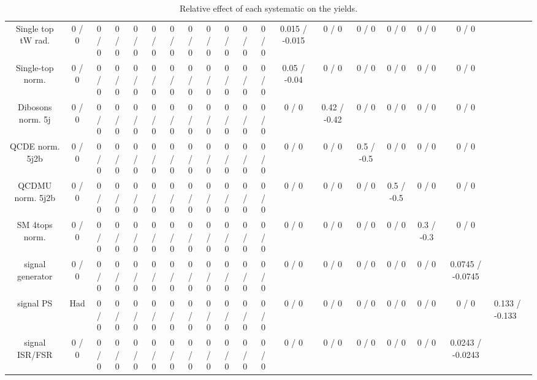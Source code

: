 \documentclass[10pt]{article}
\begin{document}
\begin{table}[htbp]
\begin{center}
\begin{tabular}{|c|c|c|c|c|c|c|c|c|c|c|c|c|c|c|c|c|c|}
  Single top tW rad. & 0 / 0 & 0 / 0 & 0 / 0 & 0 / 0 & 0 / 0 & 0 / 0 & 0 / 0 & 0 / 0 & 0 / 0 & 0 / 0 & 0 / 0 & 0.015 / -0.015 & 0 / 0 & 0 / 0 & 0 / 0 & 0 / 0 & 0 / 0 \\ 
  Single-top norm. & 0 / 0 & 0 / 0 & 0 / 0 & 0 / 0 & 0 / 0 & 0 / 0 & 0 / 0 & 0 / 0 & 0 / 0 & 0 / 0 & 0 / 0 & 0.05 / -0.04 & 0 / 0 & 0 / 0 & 0 / 0 & 0 / 0 & 0 / 0 \\ 
  Dibosons norm. 5j & 0 / 0 & 0 / 0 & 0 / 0 & 0 / 0 & 0 / 0 & 0 / 0 & 0 / 0 & 0 / 0 & 0 / 0 & 0 / 0 & 0 / 0 & 0 / 0 & 0.42 / -0.42 & 0 / 0 & 0 / 0 & 0 / 0 & 0 / 0 \\ 
  QCDE norm. 5j2b & 0 / 0 & 0 / 0 & 0 / 0 & 0 / 0 & 0 / 0 & 0 / 0 & 0 / 0 & 0 / 0 & 0 / 0 & 0 / 0 & 0 / 0 & 0 / 0 & 0 / 0 & 0.5 / -0.5 & 0 / 0 & 0 / 0 & 0 / 0 \\ 
  QCDMU norm. 5j2b & 0 / 0 & 0 / 0 & 0 / 0 & 0 / 0 & 0 / 0 & 0 / 0 & 0 / 0 & 0 / 0 & 0 / 0 & 0 / 0 & 0 / 0 & 0 / 0 & 0 / 0 & 0 / 0 & 0.5 / -0.5 & 0 / 0 & 0 / 0 \\ 
  SM 4tops norm. & 0 / 0 & 0 / 0 & 0 / 0 & 0 / 0 & 0 / 0 & 0 / 0 & 0 / 0 & 0 / 0 & 0 / 0 & 0 / 0 & 0 / 0 & 0 / 0 & 0 / 0 & 0 / 0 & 0 / 0 & 0.3 / -0.3 & 0 / 0 \\ 
  signal generator & 0 / 0 & 0 / 0 & 0 / 0 & 0 / 0 & 0 / 0 & 0 / 0 & 0 / 0 & 0 / 0 & 0 / 0 & 0 / 0 & 0 / 0 & 0 / 0 & 0 / 0 & 0 / 0 & 0 / 0 & 0 / 0 & 0.0745 / -0.0745 \\ 
  signal PS & Had & 0 / 0 & 0 / 0 & 0 / 0 & 0 / 0 & 0 / 0 & 0 / 0 & 0 / 0 & 0 / 0 & 0 / 0 & 0 / 0 & 0 / 0 & 0 / 0 & 0 / 0 & 0 / 0 & 0 / 0 & 0 / 0 & 0.133 / -0.133 \\ 
  signal ISR/FSR & 0 / 0 & 0 / 0 & 0 / 0 & 0 / 0 & 0 / 0 & 0 / 0 & 0 / 0 & 0 / 0 & 0 / 0 & 0 / 0 & 0 / 0 & 0 / 0 & 0 / 0 & 0 / 0 & 0 / 0 & 0 / 0 & 0.0243 / -0.0243 \\ 
\hline 
\end{tabular} 
\caption{Relative effect of each systematic on the yields.} 
\end{center} 
\end{table} 
\end{document}

